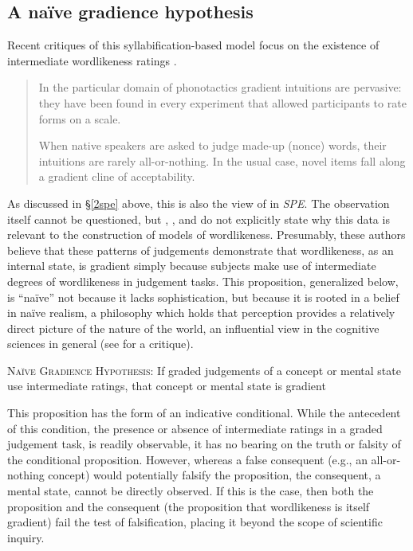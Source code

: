 \subsection{A naïve gradience hypothesis}

Recent critiques of this syllabification-based model focus on the existence of intermediate wordlikeness ratings \citep[see also][]{Coleman1997,Anttila2008a}.

\begin{quote}
In the particular domain of phonotactics gradient intuitions are pervasive: they have been found in every experiment that allowed participants to rate forms on a scale.
\citep[][382]{Hayes2008a}

When native speakers are asked to judge made-up (nonce) words, their intuitions are rarely all-or-nothing. In the usual case, novel items fall along a gradient cline of acceptability. \citep[][9]{Albright2009a}
\end{quote}

As discussed in \S\ref{2spe} above, this is also the view of \citeauthor{SPE} in \emph{SPE}. The observation itself cannot be questioned, but \citeauthor{SPE}, \citeauthor{Hayes2008a}, and \citeauthor{Albright2009a} do not explicitly state why this data is relevant to the construction of models of wordlikeness. Presumably, these authors believe that these patterns of judgements demonstrate that wordlikeness, as an internal state, is gradient simply because subjects make use of intermediate degrees of wordlikeness in judgement tasks. This proposition, generalized below, is ``naïve'' not because it lacks sophistication, but because it is rooted in a belief in naïve realism, a philosophy which holds that perception provides a relatively direct picture of the nature of the world, an influential view in the cognitive sciences in general (see \citealt{Fodor1981a} for a critique).

\begin{unlabeledexample}
\textsc{Naïve Gradience Hypothesis}: If graded judgements of a concept or mental state use intermediate ratings, that concept or mental state is gradient
\end{unlabeledexample}




This proposition has the form of an indicative conditional. While the antecedent of this condition, the presence or absence of intermediate ratings in a graded judgement task, is readily observable, it has no bearing on the truth or falsity of the conditional proposition. However, whereas a false consequent (e.g., an all-or-nothing concept) would potentially falsify the proposition, the consequent, a mental state, cannot be directly observed. If this is the case, then both the proposition and the consequent (the proposition that wordlikeness is itself gradient) fail the test of falsification, placing it beyond the scope of scientific inquiry.







